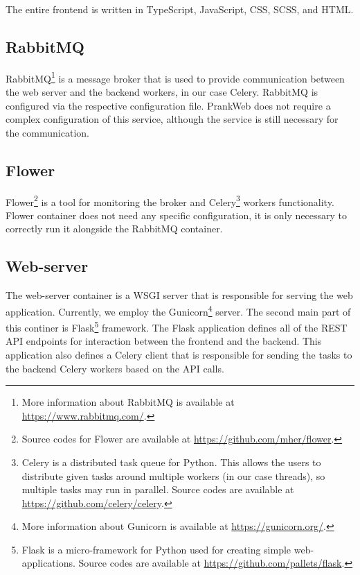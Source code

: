 The entire frontend is written in TypeScript, JavaScript, CSS, SCSS, and HTML.

\subsection{RabbitMQ}
\label{subsec:rabbitmq}

RabbitMQ\footnote{More information about RabbitMQ is available at \url{https://www.rabbitmq.com/}.} is a message broker that is used to provide communication between the web server and the backend workers, in our case Celery. RabbitMQ is configured via the respective configuration file. PrankWeb does not require a complex configuration of this service, although the service is still necessary for the communication.

\subsection{Flower}
\label{subsec:flower}

Flower\footnote{Source codes for Flower are available at \url{https://github.com/mher/flower}.} is a tool for monitoring the broker and Celery\footnote{Celery is a distributed task queue for Python. This allows the users to distribute given tasks around multiple workers (in our case threads), so multiple tasks may run in parallel. Source codes are available at \url{https://github.com/celery/celery}.} workers functionality. Flower container does not need any specific configuration, it is only necessary to correctly run it alongside the RabbitMQ container.

\subsection{Web-server}
\label{subsec:web-server}

The web-server container is a WSGI server that is responsible for serving the web application. Currently, we employ the Gunicorn\footnote{More information about Gunicorn is available at \url{https://gunicorn.org/}.} server. The second main part of this continer is Flask\footnote{Flask is a micro-framework for Python used for creating simple web-applications. Source codes are available at \url{https://github.com/pallets/flask}.} framework. The Flask application defines all of the REST API endpoints for interaction between the frontend and the backend. This application also defines a Celery client that is responsible for sending the tasks to the backend Celery workers based on the API calls.

